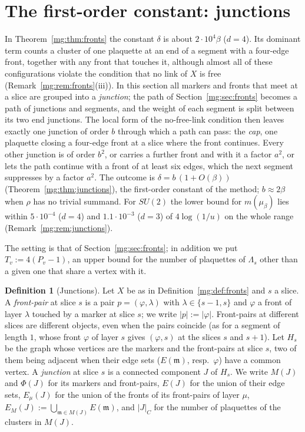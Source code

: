 \documentclass[11pt,a4paper]{article}
\theoremstyle{definition}
\newtheorem{definition}[theorem]{Definition}
\theoremstyle{remark}
\begin{document}
\section{The first-order constant: junctions}\label{mg:sec:junctions}

In Theorem~\ref{mg:thm:fronts} the constant $\delta$ is about $2\cdot10^4\beta$ ($d=4$). Its dominant term counts a cluster of one plaquette at an end of a
segment with a four-edge front, together with any front that touches it, although almost all of these configurations violate the condition that no
link of $X$ is free (Remark~\ref{mg:rem:fronts}(iii)). In this section all markers and fronts that meet at a slice are grouped into a \emph{junction};
the path of Section~\ref{mg:sec:fronts} becomes a path of junctions and segments, and the weight of each segment is split between its two end
junctions. The local form of the no-free-link condition then leaves exactly one junction of order $b$ through which a path can pass: the
\emph{cap}, one plaquette closing a four-edge front at a slice where the front continues. Every other junction is of order $b^2$, or carries a further
front and with it a factor $a^2$, or lets the path continue with a front of at least six edges, which the next segment suppresses by a factor $a^2$. The
outcome is $\delta=b\,(1+O(\beta))$ (Theorem~\ref{mg:thm:junctions}), the first-order constant of the method; $b\approx2\beta$ when $\rho$ has no trivial
summand. For $SU(2)$ the lower bound for $m(\mu_\beta)$ lies within $5\cdot10^{-4}$ ($d=4$) and $1.1\cdot10^{-3}$ ($d=3$) of $4\log(1/u)$ on the whole
range (Remark~\ref{mg:rem:junctions}).

The setting is that of Section~\ref{mg:sec:fronts}; in addition we put $T_v:=4(P_v-1)$, an upper bound for the number of plaquettes of $\Lambda_s$
other than a given one that share a vertex with it.

\begin{definition}[Junctions]\label{mg:def:junction}
Let $X$ be as in Definition~\ref{mg:def:fronts} and $s$ a slice. A \emph{front-pair} at slice $s$ is a pair $p=(\varphi,\lambda)$ with
$\lambda\in\{s-1,s\}$ and $\varphi$ a front of layer $\lambda$ touched by a marker at slice $s$; we write $|p|:=|\varphi|$. Front-pairs at different slices
are different objects, even when the pairs coincide (as for a segment of length $1$, whose front $\varphi$ of layer $s$ gives $(\varphi,s)$ at the slices
$s$ and $s+1$). Let $H_s$ be the graph whose
vertices are the markers and the front-pairs at slice $s$, two of them being adjacent when their edge sets ($E(\mathfrak m)$, resp.\ $\varphi$) have a
common vertex. A \emph{junction} at slice $s$ is a connected component $J$ of $H_s$. We write $M(J)$ and $\Phi(J)$ for its markers and front-pairs,
$E(J)$ for the union of their edge sets, $E_\mu(J)$ for the union of the fronts of its front-pairs of layer $\mu$, $E_M(J):=\bigcup_{\mathfrak m\in
M(J)}E(\mathfrak m)$, and $|J|_C$ for the number of plaquettes of the clusters in $M(J)$.
\end{definition}
\end{document}
